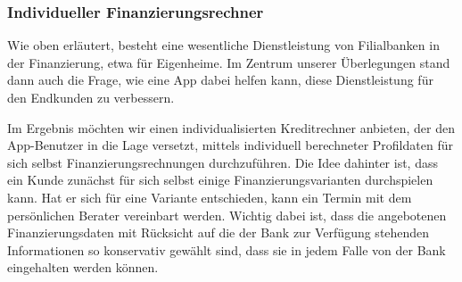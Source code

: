 \subsubsection{Individueller Finanzierungsrechner}
	Wie oben erläutert, besteht eine wesentliche Dienstleistung von Filialbanken in der Finanzierung, etwa für Eigenheime. Im Zentrum unserer Überlegungen stand dann auch die Frage, wie eine App dabei helfen kann, diese Dienstleistung für den Endkunden zu verbessern.
	
	Im Ergebnis möchten wir einen individualisierten Kreditrechner anbieten, der den App-Benutzer in die Lage versetzt, mittels individuell berechneter Profildaten für sich selbst Finanzierungsrechnungen durchzuführen. Die Idee dahinter ist, dass ein Kunde zunächst für sich selbst einige Finanzierungsvarianten durchspielen kann. Hat er sich für eine Variante entschieden, kann ein Termin mit dem persönlichen Berater vereinbart werden. Wichtig dabei ist, dass die angebotenen Finanzierungsdaten  mit Rücksicht auf die der Bank zur Verfügung stehenden Informationen so konservativ gewählt sind, dass sie in jedem Falle von der Bank eingehalten werden können.
 
    